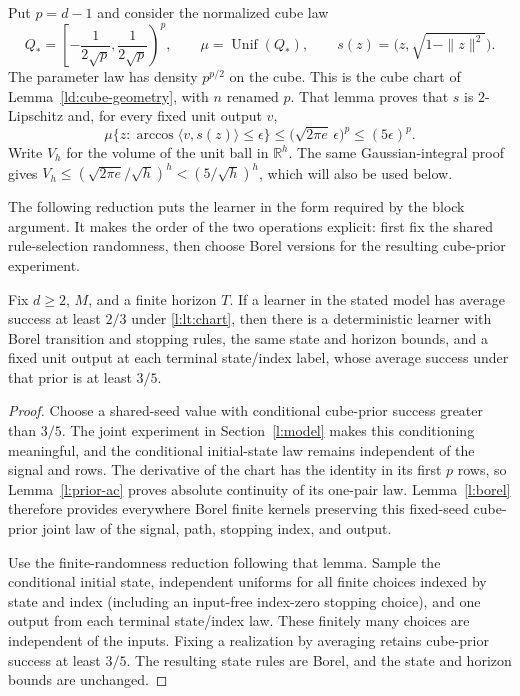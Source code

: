 Put $p=d-1$ and consider the normalized cube law
\begin{equation}\label{l:lt:chart}
 Q_*=\left[-\frac1{2\sqrt p},\frac1{2\sqrt p}\right)^p,\qquad
 \mu=\operatorname{Unif}(Q_*),\qquad
 s(z)=\bigl(z,\sqrt{1-\|z\|^2}\bigr).
\end{equation}
The parameter law has density \(p^{p/2}\) on the cube.  This is the
cube chart of Lemma~\ref{ld:cube-geometry}, with \(n\) renamed \(p\).
That lemma proves that \(s\) is \(2\)-Lipschitz and, for every fixed
unit output \(v\),
\begin{equation}\label{l:lt:output-mass}
 \mu\{z:\arccos\langle v,s(z)\rangle\le\epsilon\}
 \le\bigl(\sqrt{2\pi e}\,\epsilon\bigr)^p\le(5\epsilon)^p.
\end{equation}
Write \(V_h\) for the volume of the unit ball in \(\mathbb R^h\).
The same Gaussian-integral proof gives
\(V_h\le(\sqrt{2\pi e}/\sqrt h)^h<(5/\sqrt h)^h\), which will also
be used below.

The following reduction puts the learner in the form required by the
block argument.  It makes the order of the two operations explicit:
first fix the shared rule-selection randomness, then choose Borel
versions for the resulting cube-prior experiment.

\begin{lemma}
\label{lem:l-lt-borel}
Fix $d\ge2$, $M$, and a finite horizon $T$.  If a learner in the stated
model has average success at least $2/3$ under \eqref{l:lt:chart}, then
there is a deterministic learner with Borel transition and stopping
rules, the same state and horizon bounds, and a fixed unit output at
each terminal state/index label, whose average success under that prior
is at least $3/5$.
\end{lemma}
\begin{proof}
Choose a shared-seed value with conditional cube-prior success greater
than \(3/5\).  The joint experiment in Section~\ref{l:model} makes this
conditioning meaningful, and the conditional initial-state law remains
independent of the signal and rows.  The derivative of the chart has
the identity in its first \(p\) rows, so Lemma~\ref{l:prior-ac} proves
absolute continuity of its one-pair law.  Lemma~\ref{l:borel} therefore
provides everywhere Borel finite kernels preserving this fixed-seed
cube-prior joint law of the signal, path, stopping index, and output.

Use the finite-randomness reduction following that lemma.  Sample the
conditional initial state, independent uniforms for all finite choices
indexed by state and index (including an input-free index-zero stopping
choice), and one output from each terminal state/index law.  These
finitely many choices are independent of the inputs.  Fixing a
realization by averaging retains cube-prior success at least \(3/5\).
The resulting state rules are Borel, and the state and horizon bounds
are unchanged.
\end{proof}

